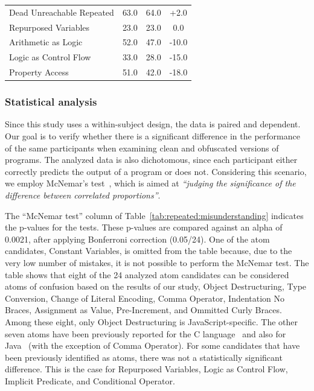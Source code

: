 \begin{table}[tb]
{\begin{scriptsize}
\begin{tabular}{lccc}
Dead Unreachable Repeated &           63.0 &      64.0 &                  +2.0 \\
Repurposed Variables      &           23.0 &      23.0 &                   0.0 \\
Arithmetic as Logic       &           52.0 &      47.0 &                 -10.0 \\
Logic as Control Flow     &           33.0 &      28.0 &                 -15.0 \\
Property Access           &           51.0 &      42.0 &                 -18.0 \\
\bottomrule  
\end{tabular}
\end{scriptsize}
}
\end{table}


\subsubsection*{Statistical analysis}

Since this study uses a within-subject design, the data is paired and dependent. Our goal is to verify whether there is a significant difference in the performance of the same participants when examining clean and obfuscated versions of programs. The analyzed data is also dichotomous, since each participant either correctly predicts the output of a program or does not. Considering this scenario, we employ McNemar's test~\cite{McNemar:1947:NSE}, which is aimed at \textit{``judging the significance of the difference between correlated proportions''}.

The ``McNemar test'' column of Table~\ref{tab:repeated:misunderstanding} indicates the p-values for the tests. These p-values are compared against an alpha of 0.0021, after applying Bonferroni correction (0.05/24). One of the atom candidates, Constant Variables, is omitted from the table because, due to the very low number of mistakes, it is not possible to perform the McNemar test. The table shows that eight of the 24 analyzed atom candidates can be considered atoms of confusion based on the results of our study, Object Destructuring, Type Conversion, Change of Literal Encoding, Comma Operator, Indentation No Braces, Assignment as Value, Pre-Increment, and Ommitted Curly Braces. Among these eight, only Object Destructuring is JavaScript-specific. The other seven atoms have been previously reported for the C language~\cite{DBLP:conf/sigsoft/GopsteinIYDZYC17} and also for Java~\cite{Langhout:2021:ACJ} (with the exception of Comma Operator). For some candidates that have been previously identified as atoms, there was not a statistically significant difference. This is the case for Repurposed Variables, Logic as Control Flow, Implicit Predicate, and Conditional Operator. 

